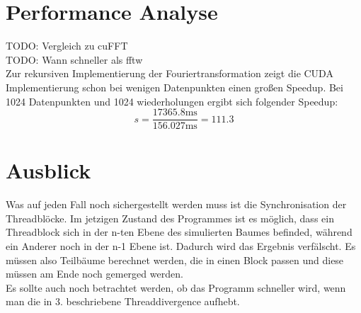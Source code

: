 \documentclass[sigconf]{acmart}
\begin{document}
\section{Performance Analyse}

TODO: Vergleich zu cuFFT\\
TODO: Wann schneller als fftw\\
Zur rekursiven Implementierung der Fouriertransformation zeigt die CUDA Implementierung schon bei wenigen Datenpunkten einen großen Speedup. Bei 1024 Datenpunkten und 1024 wiederholungen ergibt sich folgender Speedup:
\[ s = \frac{17365.8\text{ms}}{156.027\text{ms}} = 111.3\]


\section{Ausblick}

Was auf jeden Fall noch sichergestellt werden muss ist die Synchronisation der Threadblöcke. Im jetzigen Zustand des Programmes ist es möglich, dass ein Threadblock sich in der n-ten Ebene des simulierten Baumes befinded, während ein Anderer noch in der n-1 Ebene ist. Dadurch wird das Ergebnis verfälscht. Es müssen also Teilbäume berechnet werden, die in einen Block passen und diese müssen am Ende noch gemerged werden.\\
Es sollte auch noch betrachtet werden, ob das Programm schneller wird, wenn man die in 3. beschriebene Threaddivergence aufhebt.
\end{document}
